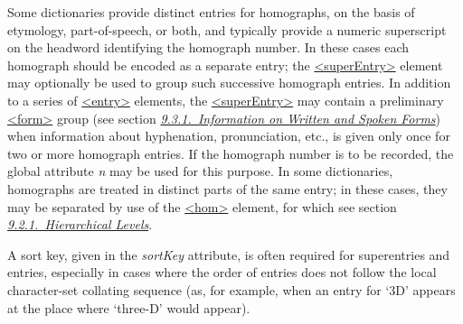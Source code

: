 Some dictionaries provide distinct entries for homographs, on the basis of etymology, part-of-speech, or both, and typically provide a numeric superscript on the headword identifying the homograph number. In these cases each homograph should be encoded as a separate entry; the \hyperref[TEI.superEntry]{<superEntry>} element may optionally be used to group such successive homograph entries. In addition to a series of \hyperref[TEI.entry]{<entry>} elements, the \hyperref[TEI.superEntry]{<superEntry>} may contain a preliminary \hyperref[TEI.form]{<form>} group (see section \textit{\hyperref[DITPFO]{9.3.1.\ Information on Written and Spoken Forms}}) when information about hyphenation, pronunciation, etc., is given only once for two or more homograph entries. If the homograph number is to be recorded, the global attribute {\itshape n} may be used for this purpose. In some dictionaries, homographs are treated in distinct parts of the same entry; in these cases, they may be separated by use of the \hyperref[TEI.hom]{<hom>} element, for which see section \textit{\hyperref[DIENHI]{9.2.1.\ Hierarchical Levels}}.\par
A sort key, given in the {\itshape sortKey} attribute, is often required for superentries and entries, especially in cases where the order of entries does not follow the local character-set collating sequence (as, for example, when an entry for ‘3D’ appears at the place where ‘three-D’ would appear).\par
